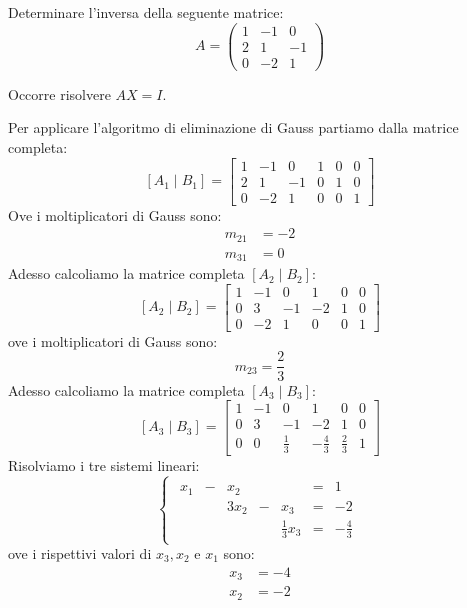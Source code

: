 \documentclass[12pt]{report}
\newcounter{exercise}
\begin{document}
\begin{exercise}{}{}
\begin{assignment}{}{}
Determinare l'inversa della seguente matrice:
\[
A = \begin{pmatrix}
	1 & -1 & 0 \\
	2 & 1 & -1 \\
	0 & -2 & 1
\end{pmatrix}
\]
\end{assignment}
Occorre risolvere $AX = I$.

Per applicare l'algoritmo di eliminazione di Gauss partiamo dalla matrice completa:
\[
[A_1 \mid B_1] = \left[\begin{array}{rrr|ccc}
	1 & -1 & 0 & 1 & 0 & 0 \\
	2 & 1 & -1 & 0 & 1 & 0 \\
	0 & -2 & 1 & 0 & 0 & 1
\end{array}
\right]
\]
Ove i moltiplicatori di Gauss sono:
\begin{align*}
	m_{21} &= -2 \\
	m_{31} &= 0
\end{align*}
Adesso calcoliamo la matrice completa $[A_2 \mid B_2]$:
\[
[A_2 \mid B_2] = \left[\begin{array}{rrr|ccc}
1 & -1 & 0 & 1 & 0 & 0 \\
0 & 3 & -1 & -2 & 1 & 0 \\
0 & -2 & 1 & 0 & 0 & 1
\end{array}
\right]
\]
ove i moltiplicatori di Gauss sono:
\[
m_{23} = \dfrac{2}{3}
\]
Adesso calcoliamo la matrice  completa $[A_3 \mid B_3]$:
\[
[A_3 \mid B_3] = \left[\begin{array}{rrr|ccc}
1 & -1 & 0 & 1 & 0 & 0 \\
0 & 3 & -1 & -2 & 1 & 0 \\
0 & 0 & \frac{1}{3} & -\frac{4}{3} & \frac{2}{3} & 1
\end{array}
\right]
\]
Risolviamo i tre sistemi lineari:
\[
\begin{cases}
\begin{array}{rcrcrcr}
  x_1 & - & x_2 & & & = & 1 \\
  &  & 3x_2 & - & x_3 & = & -2 \\
  &  &  &   & \frac{1}{3}x_3 & = & -\frac{4}{3}
\end{array}
\end{cases}
\]
ove i rispettivi valori di $x_3, x_2$ e $x_1$ sono:
\begin{align*}
x_3 &= -4 \\
x_2 &= -2 \\

\end{align*}
\end{exercise}
\end{document}
